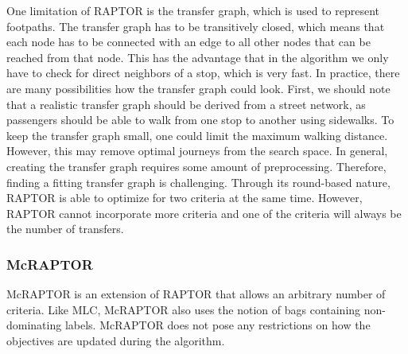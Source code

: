 One limitation of RAPTOR is the transfer graph, which is used to represent footpaths.
The transfer graph has to be transitively closed, which means that each node has to be connected with an edge to all other nodes that can be reached from that node.
This has the advantage that in the algorithm we only have to check for direct neighbors of a stop, which is very fast.
In practice, there are many possibilities how the transfer graph could look.
First, we should note that a realistic transfer graph should be derived from a street network, as passengers should be able to walk from one stop to another using sidewalks.
To keep the transfer graph small, one could limit the maximum walking distance.
However, this may remove optimal journeys from the search space.
In general, creating the transfer graph requires some amount of preprocessing.
Therefore, finding a fitting transfer graph is challenging.
Through its round-based nature, RAPTOR is able to optimize for two criteria at the same time.
However, RAPTOR cannot incorporate more criteria and one of the criteria will always be the number of transfers.


\subsubsection{McRAPTOR}
\label{subsubsec:mcraptor}

McRAPTOR \cite{dellingRoundBasedPublicTransit2015} is an extension of RAPTOR that allows an arbitrary number of criteria.
Like MLC, McRAPTOR also uses the notion of bags containing non-dominating labels.
McRAPTOR does not pose any restrictions on how the objectives are updated during the algorithm.

